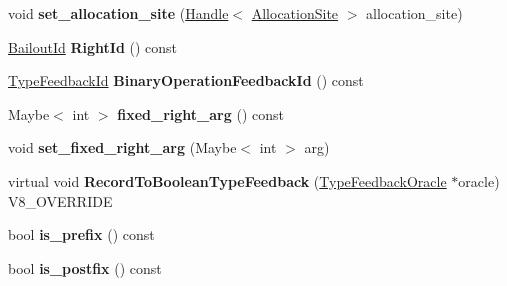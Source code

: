 \begin{DoxyCompactItemize}
\item 
\hypertarget{classv8_1_1internal_1_1_v8___f_i_n_a_l_a96613355761d701b10d1cbea36152285}{}void {\bfseries set\+\_\+allocation\+\_\+site} (\hyperlink{classv8_1_1internal_1_1_handle}{Handle}$<$ \hyperlink{classv8_1_1internal_1_1_allocation_site}{Allocation\+Site} $>$ allocation\+\_\+site)\label{classv8_1_1internal_1_1_v8___f_i_n_a_l_a96613355761d701b10d1cbea36152285}

\item 
\hypertarget{classv8_1_1internal_1_1_v8___f_i_n_a_l_aa278c815495fbd3857316bc02afb257e}{}\hyperlink{classv8_1_1internal_1_1_bailout_id}{Bailout\+Id} {\bfseries Right\+Id} () const \label{classv8_1_1internal_1_1_v8___f_i_n_a_l_aa278c815495fbd3857316bc02afb257e}

\item 
\hypertarget{classv8_1_1internal_1_1_v8___f_i_n_a_l_ac6d4f30d28169ec3ce27986d2edcda4b}{}\hyperlink{classv8_1_1internal_1_1_type_feedback_id}{Type\+Feedback\+Id} {\bfseries Binary\+Operation\+Feedback\+Id} () const \label{classv8_1_1internal_1_1_v8___f_i_n_a_l_ac6d4f30d28169ec3ce27986d2edcda4b}

\item 
\hypertarget{classv8_1_1internal_1_1_v8___f_i_n_a_l_ac1e0243bb7fc08ddd6a43f2bba893f56}{}Maybe$<$ int $>$ {\bfseries fixed\+\_\+right\+\_\+arg} () const \label{classv8_1_1internal_1_1_v8___f_i_n_a_l_ac1e0243bb7fc08ddd6a43f2bba893f56}

\item 
\hypertarget{classv8_1_1internal_1_1_v8___f_i_n_a_l_a9b23badf0f6fdbb753c62a912d589fe6}{}void {\bfseries set\+\_\+fixed\+\_\+right\+\_\+arg} (Maybe$<$ int $>$ arg)\label{classv8_1_1internal_1_1_v8___f_i_n_a_l_a9b23badf0f6fdbb753c62a912d589fe6}

\item 
\hypertarget{classv8_1_1internal_1_1_v8___f_i_n_a_l_a51949e7b3622c90c9584f38a0a0920af}{}virtual void {\bfseries Record\+To\+Boolean\+Type\+Feedback} (\hyperlink{classv8_1_1internal_1_1_type_feedback_oracle}{Type\+Feedback\+Oracle} $\ast$oracle) V8\+\_\+\+O\+V\+E\+R\+R\+I\+D\+E\label{classv8_1_1internal_1_1_v8___f_i_n_a_l_a51949e7b3622c90c9584f38a0a0920af}

\item 
\hypertarget{classv8_1_1internal_1_1_v8___f_i_n_a_l_ae1af790b4f585ac7eba3e0cb58fcabcf}{}bool {\bfseries is\+\_\+prefix} () const \label{classv8_1_1internal_1_1_v8___f_i_n_a_l_ae1af790b4f585ac7eba3e0cb58fcabcf}

\item 
\hypertarget{classv8_1_1internal_1_1_v8___f_i_n_a_l_a8532467f82535e6759d319184801c19c}{}bool {\bfseries is\+\_\+postfix} () const \label{classv8_1_1internal_1_1_v8___f_i_n_a_l_a8532467f82535e6759d319184801c19c}


\end{DoxyCompactItemize}
